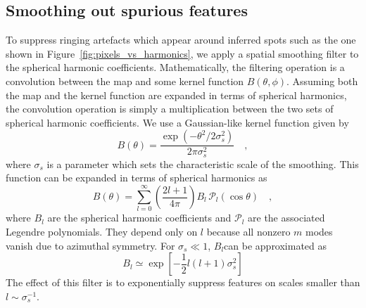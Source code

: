 \documentclass[modern]{aastex62}
\begin{document}
\subsection{Smoothing out spurious features}
\label{ssec:spurious_features}
To suppress ringing artefacts which appear around inferred spots such as the one shown in Figure~\ref{fig:pixels_vs_harmonics}, we apply a spatial smoothing filter to the spherical harmonic coefficients.
Mathematically, the filtering operation is a convolution between the map and some kernel function $B(\theta,\phi)$.
Assuming both the map and the kernel function are expanded in terms of spherical harmonics, the convolution operation is simply a multiplication between the two sets of spherical harmonic coefficients.
We use a Gaussian-like kernel function given by
\begin{equation}
    B(\theta)=\frac{\exp \left(-\theta^{2} / 2 \sigma_s^{2}\right)}{2 \pi \sigma_s^{2}}
    \quad,
\end{equation}
where $\sigma_s$ is a parameter which sets the characteristic scale of the smoothing.
This function can be expanded in terms of spherical harmonics as
\begin{equation}
    B(\theta)=\sum_{l=0}^{\infty}\left(\frac{2 l+1}{4 \pi}\right) B_{l} \,\mathcal{P}_{l}(\cos \theta)
    \quad,
\end{equation}
where $B_l$ are the spherical harmonic coefficients and $\mathcal{P}_l$ are the associated Legendre polynomials.
They depend only on $l$ because all nonzero $m$ modes vanish due to azimuthal symmetry.
For $\sigma_s\ll 1$, $B_l$can be approximated as \citep{seon2007,white1995}
\begin{equation}
    B_l\simeq \exp\left[-\frac{1}{2}l(l+1)\sigma_s^2\right]
\end{equation}
The effect of this filter is to exponentially suppress features on scales smaller than $l\sim \sigma_s^{-1}$.
\end{document}
